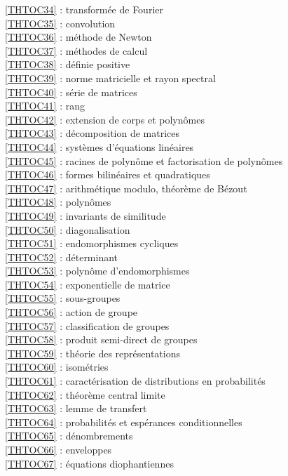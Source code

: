 \ref {THTOC34} : transformée de Fourier\\
\ref {THTOC35} : convolution\\
\ref {THTOC36} : méthode de Newton\\
\ref {THTOC37} : méthodes de calcul\\
\ref {THTOC38} : définie positive\\
\ref {THTOC39} : norme matricielle et rayon spectral\\
\ref {THTOC40} : série de matrices\\
\ref {THTOC41} : rang\\
\ref {THTOC42} : extension de corps et polynômes\\
\ref {THTOC43} : décomposition de matrices\\
\ref {THTOC44} : systèmes d'équations linéaires\\
\ref {THTOC45} : racines de polynôme et factorisation de polynômes\\
\ref {THTOC46} : formes bilinéaires et quadratiques\\
\ref {THTOC47} : arithmétique modulo, théorème de Bézout\\
\ref {THTOC48} : polynômes\\
\ref {THTOC49} : invariants de similitude\\
\ref {THTOC50} : diagonalisation\\
\ref {THTOC51} : endomorphismes cycliques\\
\ref {THTOC52} : déterminant\\
\ref {THTOC53} : polynôme d'endomorphismes\\
\ref {THTOC54} : exponentielle de matrice\\
\ref {THTOC55} : sous-groupes\\
\ref {THTOC56} : action de groupe\\
\ref {THTOC57} : classification de groupes\\
\ref {THTOC58} : produit semi-direct de groupes\\
\ref {THTOC59} : théorie des représentations\\
\ref {THTOC60} : isométries\\
\ref {THTOC61} : caractérisation de distributions en probabilités\\
\ref {THTOC62} : théorème central limite\\
\ref {THTOC63} : lemme de transfert\\
\ref {THTOC64} : probabilités et espérances conditionnelles\\
\ref {THTOC65} : dénombrements\\
\ref {THTOC66} : enveloppes\\
\ref {THTOC67} : équations diophantiennes\\
